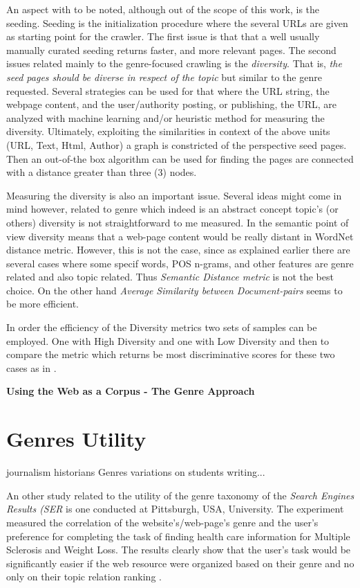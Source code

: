  An aspect with to be noted, although out of the scope of this work, is the seeding. Seeding is the initialization procedure where the several URLs are given as starting point for the crawler. The first issue is that that a well usually manually curated seeding returns faster, and more relevant pages. The second issues related mainly to the genre-focused crawling is the \textit{diversity}. That is, \textit{the seed pages should be diverse in respect of the topic} but similar to the genre requested. Several strategies can be used for that where the URL string, the webpage content, and the user/authority posting, or publishing, the URL, are analyzed with machine learning and/or heuristic method for measuring the diversity. Ultimately, exploiting the similarities in context of the above units (URL, Text, Html, Author) a graph is constricted of the perspective seed pages. Then an out-of-the box algorithm can be used for finding the pages are connected with a distance greater than three (3) nodes.
 
 Measuring the diversity is also an important issue. Several ideas might come in mind however, related to genre which indeed is an abstract concept topic's (or others) diversity is not straightforward to me measured. In the semantic point of view diversity means that a web-page content would be really distant in WordNet distance metric. However, this is not the case, since as explained earlier there are several cases where some specif words, POS n-grams, and other features are genre related and also topic related. Thus \textit{Semantic Distance metric } is not the best choice. On the other hand \textit{Average Similarity between Document-pairs} seems to be more efficient. 
 
 In order the efficiency of the Diversity metrics two sets of samples can be employed. One with High Diversity and one with Low Diversity and then to compare the metric which returns be most discriminative scores for these two cases as in \parencite{priyatam2013don_URL}.
 
 \textbf{Using the Web as a Corpus - The Genre Approach}
    

\section{Genres Utility}\label{chap:relevant_work:sec:intro}
journalism historians
Genres variations on students writing...

An other study related to the utility of the genre taxonomy of the \textit{Search Engines Results (SER} is one conducted at Pittsburgh, USA, University.  The experiment measured the correlation of the website's/web-page's genre and the user's preference for completing the task of finding health care information for Multiple Sclerosis and Weight Loss. The results clearly show that the user's task would be significantly easier if the web resource were organized based on their genre and no only on their topic relation ranking \parencite{chi2018sources}.

